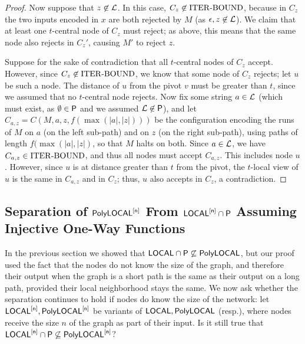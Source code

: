 \begin{proof}
Now suppose that $z \not \in \mathcal{L}$.
In this case, $C_z \not \in {\mathrm{ITER\text{-}BOUND}}$,
because in $C_z$ the two inputs encoded in $x$ are both rejected by $M$ (as $\epsilon, z \not \in \mathcal{L}$).
We claim that at least one $t$-central node of $C_z$ must reject;
as above, this means that the same node also rejects in $C_z'$,
causing $M'$ to reject $z$.

Suppose for the sake of contradiction that all $t$-central nodes of $C_z$ accept.
However, since $C_z \not \in {\mathrm{ITER\text{-}BOUND}}$, we know that some node of $C_z$ rejects;
let $u$ be such a node.
The distance of $u$ from the pivot $v$ must be greater than $t$, since we assumed that no $t$-central node rejects.
Now fix some string $a \in \mathcal{L}$ (which must exist, as $\emptyset \in {\mathsf{P}}$ and we assumed $\mathcal{L} \not \in {\mathsf{P}}$),
and let $C_{a,z} = C(M,a,z,f(\max(|a|,|z|)))$
be the configuration encoding the runs of $M$ on $a$ (on the left sub-path)
and on $z$ (on the right sub-path), using paths of length $f(\max(|a|,|z|)$,
so that $M$ halts on both.
Since $a \in \mathcal{L}$,
we have $C_{a,z} \in {\mathrm{ITER\text{-}BOUND}}$,
and thus all nodes must accept $C_{a,z}$.
This includes node $u$.
However, since $u$ is at distance greater than $t$ from the pivot,
the $t$-local view of $u$ is the same in $C_{a,z}$ and in $C_z$;
thus, $u$ also accepts in $C_z$, a contradiction.
\end{proof}












\subsection{Separation of $\mathsf{PolyLOCAL}^{[\mathsf{n}]}$ From ${\mathsf{LOCAL}}^{[\mathsf{n}]} \cap {\mathsf{P}}$ Assuming Injective One-Way Functions}
\label{sec:owf}
In the previous section we showed that ${\mathsf{LOCAL}} \cap {\mathsf{P}} \not \subseteq {\mathsf{PolyLOCAL}}$,
but our proof used the fact that the nodes do not know the size of the graph,
and therefore their output when the graph is a short path is the same as their output on a long path,
provided their local neighborhood stays the same.
We now ask whether the separation continues to hold if nodes do know the size of the network:
let ${\mathsf{LOCAL}}^{[\mathsf{n}]}, \mathsf{PolyLOCAL}^{[\mathsf{n}]}$ be variants of ${\mathsf{LOCAL}}, {\mathsf{PolyLOCAL}}$ (resp.),
where nodes receive the size $n$ of the graph as part of their input.
Is it still true that ${\mathsf{LOCAL}}^{[\mathsf{n}]} \cap {\mathsf{P}} \not \subseteq \mathsf{PolyLOCAL}^{[\mathsf{n}]}$?

